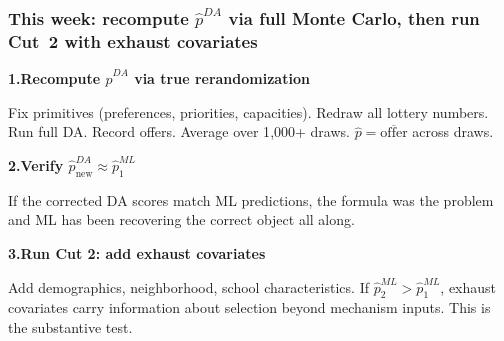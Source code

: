 \documentclass[aspectratio=169,11pt]{beamer}
\begin{document}
\begin{frame}
\frametitle{This week: recompute $\hat{p}^{DA}$ via full Monte Carlo,
then run Cut~2 with exhaust covariates}

\textbf{\color{accent}1.\quad Recompute $\hat{p}^{DA}$ via true rerandomization}

Fix primitives (preferences, priorities, capacities).
Redraw all lottery numbers.
Run full DA.
Record offers.
Average over 1{,}000+ draws.
$\hat{p} = \overline{\text{offer}}$ across draws.

\vspace{0.5cm}
\textbf{\color{accent}2.\quad Verify $\hat{p}^{DA}_{\text{new}} \approx \hat{p}^{ML}_1$}

If the corrected DA scores match ML predictions,
the formula was the problem and ML has been recovering the correct
object all along.

\vspace{0.5cm}
\textbf{\color{accent}3.\quad Run Cut 2: add exhaust covariates}

Add demographics, neighborhood, school characteristics.
If $\hat{p}^{ML}_2 > \hat{p}^{ML}_1$,
exhaust covariates carry information about selection beyond
mechanism inputs.
This is the substantive test.
\end{frame}
\end{document}
